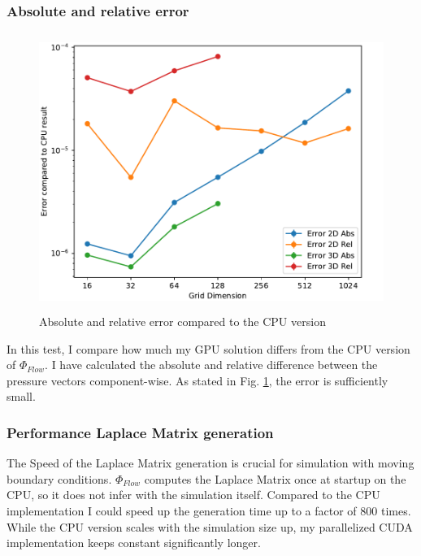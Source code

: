 \subsubsection{Absolute and relative error}
\begin{figure}[t]
\centering
	\includegraphics[height=9cm, width=14cm]{figures/error}
\caption{Absolute and relative error compared to the CPU version} \label{fig:error}
\end{figure}
In this test, I compare how much my GPU solution differs from the CPU version of $\Phi_{Flow}$. I have calculated the absolute and relative difference between the pressure vectors component-wise. As stated in Fig. \ref{fig:error}, the error is sufficiently small.

\clearpage
\subsubsection{Performance Laplace Matrix generation}
The Speed of the Laplace Matrix generation is crucial for simulation with moving boundary conditions. $\Phi_{Flow}$ computes the Laplace Matrix once at startup on the CPU, so it does not infer with the simulation itself. Compared to the CPU implementation I could speed up the generation time up to a factor of 800 times. While the CPU version scales with the simulation size up, my parallelized CUDA implementation keeps constant significantly longer.


